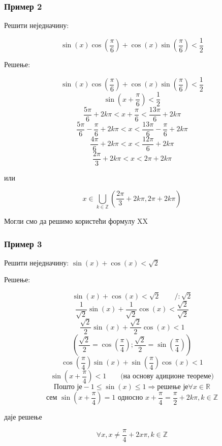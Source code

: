 \documentclass[../diplomski.tex]{subfiles}
\begin{document}
\subsubsection{Пример 2}

Решити неједначину:

\[\sin(x)\cos\left(\frac{\pi}{6}\right)+\cos(x)\sin\left(\frac{\pi}{6}\right)<\frac{1}{2}\]

Решење:



\[\sin(x)\cos\left(\frac{\pi}{6}\right)+\cos(x)\sin\left(\frac{\pi}{6}\right)<\frac{1}{2}\]
\[\sin\left(x+\frac{\pi}{6}\right)<\frac{1}{2}\]
\[\frac{5\pi}{6}+2k\pi<x+\frac{\pi}{6}<\frac{13\pi}{6}+2k\pi\]
\[\frac{5\pi}{6}-\frac{\pi}{6}+2k\pi<x<\frac{13\pi}{6}-\frac{\pi}{6}+2k\pi\]
\[\frac{4\pi}{6}+2k\pi<x<\frac{12\pi}{6}+2k\pi\]
\[\frac{2\pi}{3}+2k\pi<x<2\pi+2k\pi\]
\centerline{или}
\[x\in\bigcup_{k\in\mathbb{Z}}\left(\frac{2\pi}{3}+2k\pi,2\pi+2k\pi\right)\]

Могли смо да решимо користећи формулу XX


\subsubsection{Пример 3}

Решити неједначину: $\sin(x)+\cos(x)<\sqrt{2}$

Решење:

\[\sin(x)+\cos(x)<\sqrt{2}\qquad/:\sqrt{2}\]
\[\frac{1}{\sqrt{2}}\sin(x)+\frac{1}{\sqrt{2}}\cos(x)<\frac{\sqrt{2}}{\sqrt{2}}\]
\[\frac{\sqrt{2}}{2}\sin(x)+\frac{\sqrt{2}}{2}\cos(x)<1\]
\[(\frac{\sqrt{2}}{2}=\cos(\frac{\pi}{4});\frac{\sqrt{2}}{2}=\sin(\frac{\pi}{4}))\]
\[\cos(\frac{\pi}{4})\sin(x)+\sin(\frac{\pi}{4})\cos(x)<1\]
\[\sin(x+\frac{\pi}{4})<1\qquad\text{(на основу адиционе теореме)}\]
\[\text{Пошто је} -1\leqslant\sin(x)\leqslant1\Rightarrow \text{решење је} \forall x\in\mathbb{R}\]
\[\text{сем } \sin\left(x+\frac{\pi}{4}\right)=1\text{ односно }x+\frac{\pi}{4}=\frac{\pi}{2}+2k\pi,k\in\mathbb{Z}\]
\centerline{даје решење}
\[\forall x,x\neq\frac{\pi}{4}+2x\pi,k\in\mathbb{Z}\]
\end{document}
